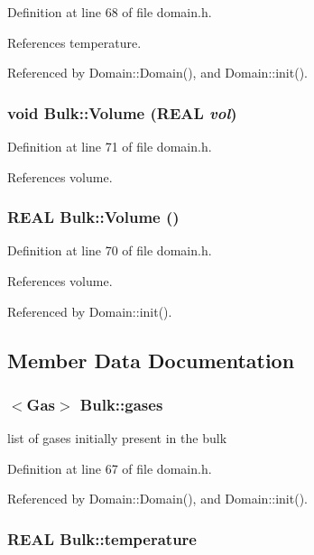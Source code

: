 Definition at line 68 of file domain.h.

References temperature.

Referenced by Domain::Domain(), and Domain::init().\hypertarget{classBulk_0be4e849c0cc7db4a4d630fc702dfea8}{
\subsubsection[{Volume}]{\setlength{\rightskip}{0pt plus 5cm}void Bulk::Volume (REAL {\em vol})}}
\label{classBulk_0be4e849c0cc7db4a4d630fc702dfea8}




Definition at line 71 of file domain.h.

References volume.\hypertarget{classBulk_8963a26979d5c6b828efeb4ab9705066}{
\subsubsection[{Volume}]{\setlength{\rightskip}{0pt plus 5cm}REAL Bulk::Volume ()}}
\label{classBulk_8963a26979d5c6b828efeb4ab9705066}




Definition at line 70 of file domain.h.

References volume.

Referenced by Domain::init().

\subsection{Member Data Documentation}
\hypertarget{classBulk_fd6da0b732d536d58c95ccda093d8994}{
\subsubsection[{gases}]{$<$Gas$>$ {\bf Bulk::gases}}}
\label{classBulk_fd6da0b732d536d58c95ccda093d8994}


list of gases initially present in the bulk 



Definition at line 67 of file domain.h.

Referenced by Domain::Domain(), and Domain::init().\hypertarget{classBulk_502aae16bd537c2989f66b0553841eec}{
\subsubsection[{temperature}]{\setlength{\rightskip}{0pt plus 5cm}REAL {\bf Bulk::temperature}}}
\label{classBulk_502aae16bd537c2989f66b0553841eec}




